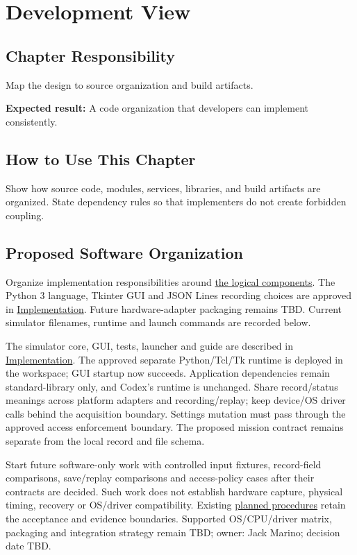 \chapter{Development View}
\section{Chapter Responsibility}
\label{Section:DevelopmentViewResponsibility}
Map the design to source organization and build artifacts.

\noindent\textbf{Expected result:} A code organization that developers can implement consistently.

\section{How to Use This Chapter}
Show how source code, modules, services, libraries, and build artifacts are organized. State dependency rules so that implementers do not create forbidden coupling.
\section{Proposed Software Organization}
\label{Section:SoftwareOrganization}
Organize implementation responsibilities around
\hyperref[Table:SoftwareResponsibilities]{the logical components}. The
Python 3 language, Tkinter GUI and JSON Lines recording choices are approved in \hyperref[Section:ApprovedSoftwareChoices]{Implementation}. Future hardware-adapter packaging remains TBD. Current simulator filenames, runtime and launch commands are recorded below.

The simulator core, GUI, tests, launcher and guide are described in \hyperref[Section:SimulatorPrototype]{Implementation}. The approved separate Python/Tcl/Tk runtime is deployed in the workspace; GUI startup now succeeds. Application dependencies remain standard-library only, and Codex's runtime is unchanged.
Share record/status meanings across platform adapters and recording/replay;
keep device/OS driver calls behind the acquisition boundary. Settings mutation
must pass through the approved access enforcement boundary. The proposed
mission contract remains separate from the local record and file schema.

Start future software-only work with controlled input fixtures, record-field
comparisons, save/replay comparisons and access-policy cases after their
contracts are decided. Such work does not establish hardware capture, physical
timing, recovery or OS/driver compatibility. Existing
\hyperref[Table:WeekTwoTests]{planned procedures} retain the acceptance and
evidence boundaries. Supported OS/CPU/driver matrix, packaging and integration
strategy remain TBD; owner: Jack Marino; decision date TBD.
